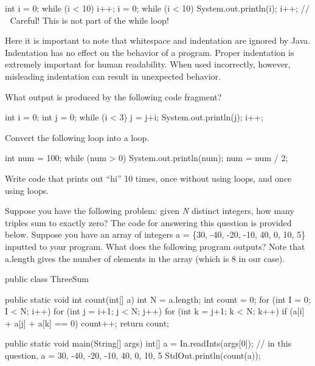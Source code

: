 \begin{code}
int i = 0;
while (i < 10)
    i++;
i = 0;
while (i < 10)
    System.out.println(i);
    i++;
// ^^^ Careful! This is not part of the while loop!
\end{code}

Here it is important to note that whitespace and indentation are ignored by Java. Indentation has no effect on the behavior of a program. Proper indentation is extremely important for human readability. When used incorrectly, however, misleading indentation can result in unexpected behavior.

\exercisesection

\begin{exercise}
What output is produced by the following code fragment?

\begin{code}
int i = 0;
int j = 0;
while (i < 3)
{
  j = j+i;
  System.out.println(j);
  i++;
}
\end{code}
\end{exercise}

\begin{exercise}
Convert the following loop into a  loop.

\begin{code}
int num = 100;
while (num > 0)
{
    System.out.println(num);
    num = num / 2;
}
\end{code}
\end{exercise}

\begin{exercise}
  Write code that prints out ``hi'' 10 times, once without using loops, and once
  using loops.
\end{exercise}

\begin{exercise}
Suppose you have the following problem: given \textit{N} distinct integers, how many triples sum to exactly zero? The code for answering this question is provided below. Suppose you have an array of integers a = \{30, -40, -20, -10, 40, 0, 10, 5\} inputted to your program. What does the following program outputs? Note that a.length gives the number of elements in the array (which is 8 in our case).

\begin{code}
public class ThreeSum 
{
    public static void int count(int[] a) 
    {
        int N = a.length;
        int count = 0;
	for (int I = 0; I < N; i++)
		for (int j = i+1; j < N; j++)
			for (int k = j+1; k < N; k++)
				if (a[i] + a[j] + a[k] == 0)
					count++;
        return count;
    }

    public static void main(String[] args)
        { 
        int[] a = In.readInts(args[0]);
        // in this question, a = {30, -40, -20, -10, 40, 0, 10, 5}
        StdOut.println(count(a));
        }
}
    
\end{code}

\end{exercise}
